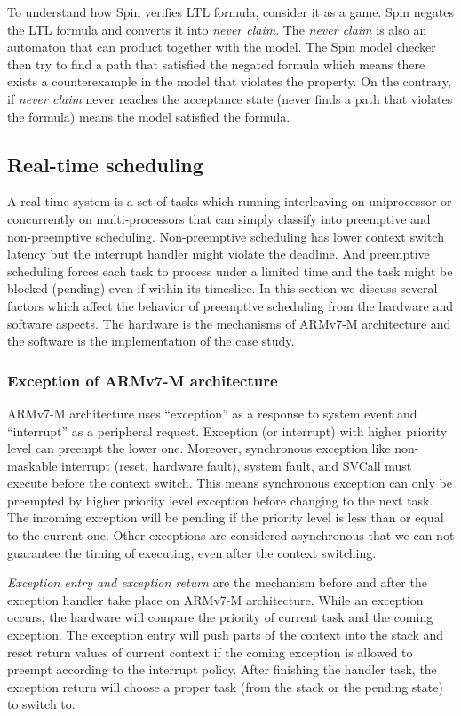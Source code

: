 To understand how Spin verifies LTL formula, consider it as a game. Spin negates the LTL formula and converts it into \textit{never claim}. The \textit{never claim} is also an automaton that can product together with the model. The Spin model checker then try to find a path that satisfied the negated formula which means there exists a counterexample in the model that violates the property. On the contrary, if \textit{never claim} never reaches the acceptance state (never finds a path that violates the formula) means the model satisfied the formula.

\subsection{Real-time scheduling}
A real-time system is a set of tasks which running interleaving on uniprocessor or concurrently on multi-processors that can simply classify into preemptive and non-preemptive scheduling. Non-preemptive scheduling has lower context switch latency but the interrupt handler might violate the deadline. And preemptive scheduling forces each task to process under a limited time and the task might be blocked (pending) even if within its timeslice. In this section we discuss several factors which affect the behavior of preemptive scheduling from the hardware and software aspects. The hardware is the mechanisms of ARMv7-M architecture and the software is the implementation of the case study.

\subsubsection{Exception of ARMv7-M architecture}
ARMv7-M architecture \cite{ARMv7-M:Manual, Yiu:2013:DGA:2602039} uses ``exception'' as a response to system event and ``interrupt'' as a peripheral request. Exception (or interrupt) with higher priority level can preempt the lower one. Moreover, synchronous exception like non-maskable interrupt (reset, hardware fault), system fault, and SVCall must execute before the context switch. This means synchronous exception can only be preempted by higher priority level exception before changing to the next task. The incoming exception will be pending if the priority level is less than or equal to the current one. Other exceptions are considered asynchronous that we can not guarantee the timing of executing, even after the context switching.

\textit{Exception entry and exception return} are the mechanism before and after the exception handler take place on ARMv7-M architecture. While an exception occurs, the hardware will compare the priority of current task and the coming exception. The exception entry will push parts of the context into the stack and reset return values of current context if the coming exception is allowed to preempt according to the interrupt policy. After finishing the handler task, the exception return will choose a proper task (from the stack or the pending state) to switch to.

